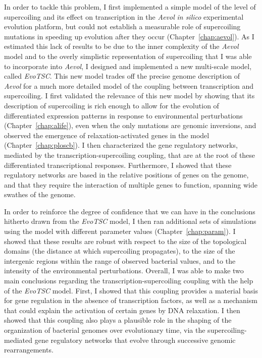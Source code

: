 In order to tackle this problem, I first implemented a simple model of the level of supercoiling and its effect on transcription in the \emph{Aevol} \emph{in silico} experimental evolution platform, but could not establish a measurable role of supercoiling mutations in speeding up evolution after they occur (Chapter~\ref{chap:aevol}).
As I estimated this lack of results to be due to the inner complexity of the \emph{Aevol} model and to the overly simplistic representation of supercoiling that I was able to incorporate into \emph{Aevol}, I designed and implemented a new multi-scale model, called \emph{EvoTSC}.
This new model trades off the precise genome description of \emph{Aevol} for a much more detailed model of the coupling between transcription and supercoiling.
I first validated the relevance of this new model by showing that its description of supercoiling is rich enough to allow for the evolution of differentiated expression patterns in response to environmental perturbations (Chapter~\ref{chap:alife}), even when the only mutations are genomic inversions, and observed the emergence of relaxation-activated genes in the model (Chapter~\ref{chap:ploscb}).
I then characterized the gene regulatory networks, mediated by the transcription-supercoiling coupling, that are at the root of these differentiated transcriptional responses.
Furthermore, I showed that these regulatory networks are based in the relative positions of genes on the genome, and that they require the interaction of multiple genes to function, spanning wide swathes of the genome.

In order to reinforce the degree of confidence that we can have in the conclusions hitherto drawn from the \emph{EvoTSC} model, I then ran additional sets of simulations using the model with different parameter values (Chapter~\ref{chap:param}).
I showed that these results are robust with respect to the size of the topological domains (the distance at which supercoiling propagates), to the size of the intergenic regions within the range of observed bacterial values, and to the intensity of the environmental perturbations.
Overall, I was able to make two main conclusions regarding the transcription-supercoiling coupling with the help of the \emph{EvoTSC} model.
First, I showed that this coupling provides a material basis for gene regulation in the absence of transcription factors, as well as a mechanism that could explain the activation of certain genes by DNA relaxation.
I then showed that this coupling also plays a plausible role in the shaping of the organization of bacterial genomes over evolutionary time, via the supercoiling-mediated gene regulatory networks that evolve through successive genomic rearrangements.

